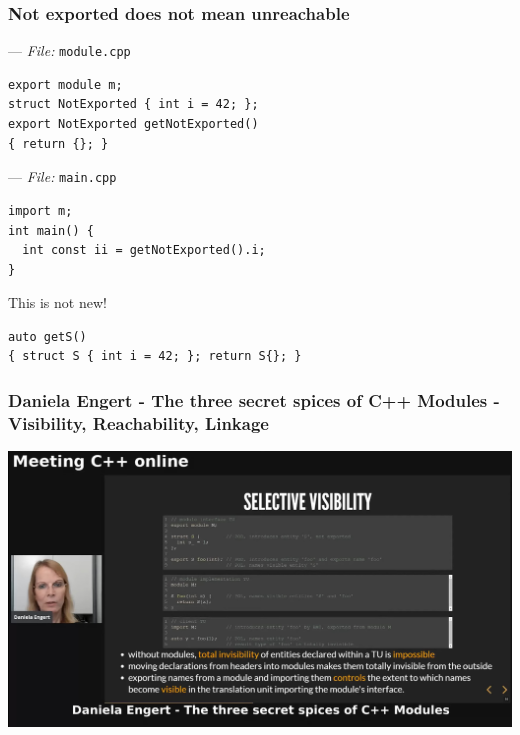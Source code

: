\documentclass[aspectratio=169]{beamer}
\newif\iftransitions
\newcommand{\cpause}{\iftransitions \pause \fi}
\begin{document}
\begin{frame}[fragile]
  \frametitle{Not exported does not mean unreachable}

  --- \textit{File:} \texttt{module.cpp}
  \begin{lstlisting}[style=cpp20]
export module m;
struct NotExported { int i = 42; };
export NotExported getNotExported()
{ return {}; }
  \end{lstlisting}
  \cpause
  --- \textit{File:} \texttt{main.cpp}
  \begin{lstlisting}[style=cpp20]
import m;
int main() {
  int const ii = getNotExported().i;
}
  \end{lstlisting}
  \cpause
  This is not new!
  \begin{lstlisting}[style=cpp20]
auto getS()
{ struct S { int i = 42; }; return S{}; }
  \end{lstlisting}

\end{frame}

\begin{frame}
  \frametitle{Daniela Engert - The three secret spices of C++ Modules - \\ Visibility, Reachability, Linkage}
  \begin{center}
    \href{https://www.youtube.com/watch?v=l_83lyxWGtE}
    {\includegraphics[height=.8\textheight]{modulesgfx/engert_three_spices.jpg}}
  \end{center}
\end{frame}
\end{document}
